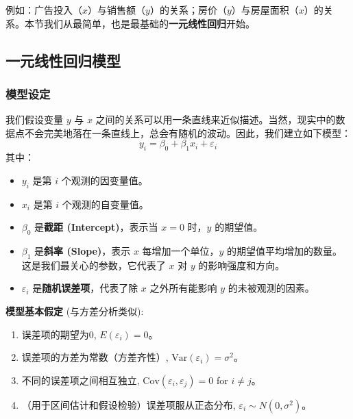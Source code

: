 \documentclass[12pt, a4paper]{amsart}
\begin{document}
例如：广告投入（$x$）与销售额（$y$）的关系；房价（$y$）与房屋面积（$x$）的关系。本节我们从最简单，也是最基础的\textbf{一元线性回归}开始。

\begin{center}
\end{center}

\subsection{一元线性回归模型}

\subsubsection{模型设定}
我们假设变量 $y$ 与 $x$ 之间的关系可以用一条直线来近似描述。当然，现实中的数据点不会完美地落在一条直线上，总会有随机的波动。因此，我们建立如下模型：
$$ y_i = \beta_0 + \beta_1 x_i + \varepsilon_i $$
其中：
\begin{itemize}
    \item $y_i$ 是第 $i$ 个观测的因变量值。
    \item $x_i$ 是第 $i$ 个观测的自变量值。
    \item $\beta_0$ 是\textbf{截距 (Intercept)}，表示当 $x=0$ 时，$y$ 的期望值。
    \item $\beta_1$ 是\textbf{斜率 (Slope)}，表示 $x$ 每增加一个单位，$y$ 的期望值平均增加的数量。这是我们最关心的参数，它代表了 $x$ 对 $y$ 的影响强度和方向。
    \item $\varepsilon_i$ 是\textbf{随机误差项}，代表了除 $x$ 之外所有能影响 $y$ 的未被观测的因素。
\end{itemize}

\textbf{模型基本假定} (与方差分析类似):
\begin{enumerate}
    \item 误差项的期望为0, $E(\varepsilon_i) = 0$。
    \item 误差项的方差为常数（方差齐性）, $\text{Var}(\varepsilon_i) = \sigma^2$。
    \item 不同的误差项之间相互独立, $\text{Cov}(\varepsilon_i, \varepsilon_j) = 0$ for $i \neq j$。
    \item （用于区间估计和假设检验）误差项服从正态分布, $\varepsilon_i \sim N(0, \sigma^2)$。
\end{enumerate}
\end{document}
